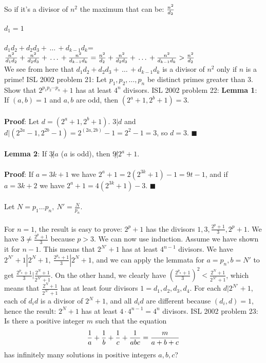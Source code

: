 So if it's a divisor of ${n^2}$ the maximum that can be: ${{n^2}\over d_2}$ \\\\
$d_1 = 1$ \\\\
$d_1d_2+d_2d_3+\,\ldots\,+d_{k-1}d_k$=${{n^2}\over d_1d_2}+{{n^2}\over d_2d_3}+\,\ldots\,+{{n^2}\over d_{k-1}d_k} = {{n^2}\over d_2}+{{n^2}\over d_2d_3}+\,\ldots\,+{{n^2}\over d_{k-1}d_k} > {{n^2}\over d_2}$ \\
We see from here that $d_1d_2+d_2d_3+\,\ldots\,+d_{k-1}d_k$ is a divisor of ${n^2}$ only if $n$ is a prime! 
ISL 2002 problem 21:  Let $p_1,p_2,\ldots,p_n$ be distinct primes greater than $3$. Show that $2^{p_1p_2\cdots p_n}+1$ has at least $4^n$ divisors. 
ISL 2002 problem 22:  \textbf{Lemma 1}: If $(a,b)=1$ and $a,b$ are odd, then $(2^a+1,2^b+1)=3$. \\\\
\textbf{Proof}: Let $d=(2^a+1,2^b+1)$. $3|d$ and $d|(2^{2a}-1,2^{2b}-1)=2^{(2a,2b)}-1=2^2-1=3$, so $d=3$. $\blacksquare$ \\\\
\textbf{Lemma 2}: If $3\not |a$ ($a$ is odd), then $9\not |2^a+1$. \\\\
\textbf{Proof}: If $a=3k+1$ we have $2^a+1=2(2^{3k}+1)-1=9t-1$, and if $a=3k+2$ we have $2^a+1=4(2^{3k}+1)-3$. $\blacksquare$ \\\\
Let $N=p_1\ldots p_n,\ N'=\frac N{p_n}$. \\\\
For $n=1$, the result is easy to prove: $2^p+1$ has the divisors $1, 3, \frac{2^p+1}3, 2^p+1$. We have $3\ne \frac{2^p+1}3$ because $p>3$. We can now use induction. Assume we have shown it for $n-1$. This means that $2^{N'}+1$ has at least $4^{n-1}$ divisors. We have $2^{N'}+1|2^N+1,\ \frac{2^{p_n}+1}3|2^N+1$, and we can apply the lemmata for $a=p_n, b=N'$ to get $\frac{2^{p_n}+1}3\big|\frac{2^N+1}{2^{N'}+1}$. On the other hand, we clearly have $\left(\frac{2^{p_n}+1}3\right)^2<\frac{2^N+1}{2^{N'}+1}$, which means that $\frac{2^N+1}{2^{N'}+1}$ has at least four divisors $1=d_1,d_2,d_3,d_4$. For each $d|2^{N'}+1$, each of $d_id$ is a divisor of $2^N+1$, and all $d_id$ are different because $(d_i,d)=1$, hence the result: $2^N+1$ has at least $4\cdot 4^{n-1}=4^n$ divisors. 
ISL 2002 problem 23:  Is there a positive integer $m$ such that the equation
\[ {1\over a}+{1\over b}+{1\over c}+{1\over abc}={m\over a+b+c} \]
has infinitely many solutions in positive integers $a,b,c$? 

